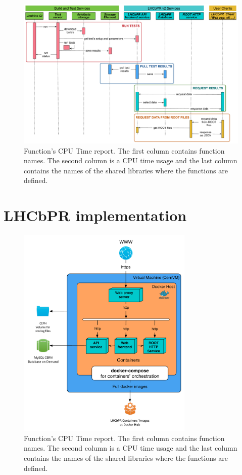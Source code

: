 \documentclass[a4paper]{jpconf}
\begin{document}
\begin{figure}[H]
\begin{minipage}{\textwidth}
\includegraphics[width=\textwidth]{figs/LHCbPR2.pdf}
\caption{\label{fig01}Function’s CPU Time report. The first column contains function names. The second column is a CPU 
time usage and the last column contains the names of the shared libraries where the functions are defined.}
\end{minipage}
\end{figure}

\section{LHCbPR implementation}

\begin{figure}[H]
\begin{minipage}{\textwidth}
\includegraphics[width=0.75\textwidth]{figs/lhcbpr-nodes.pdf}
\caption{\label{fig01}Function’s CPU Time report. The first column contains function names. The second column is a CPU 
time usage and the last column contains the names of the shared libraries where the functions are defined.}
\end{minipage}
\end{figure}
\end{document}
